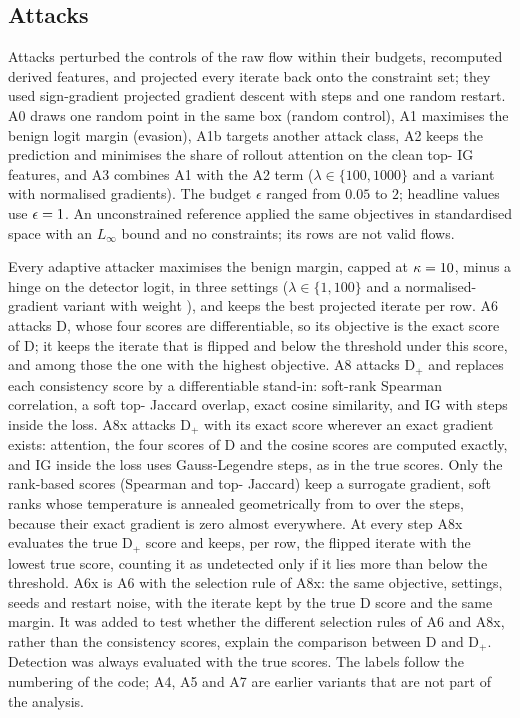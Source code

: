 \subsection*{Attacks}
\label{sec:attacks}
Attacks perturbed the controls of the raw flow within their budgets, recomputed derived features, and projected every
iterate back onto the constraint set; they used sign-gradient projected gradient descent with \paramSteps{} steps and
one random restart.
A0 draws one random point in the same box (random control), A1 maximises the benign logit margin (evasion), A1b targets
another attack class, A2 keeps the prediction and minimises the share of rollout attention on the clean
top-\paramTopK{} IG features, and A3 combines A1 with the A2 term ($\lambda \in \{100, 1000\}$ and a variant with
normalised gradients).
The budget $\epsilon$ ranged from $0.05$ to $2$; headline values use $\epsilon = 1$.
An unconstrained reference applied the same objectives in standardised space with an $L_\infty$ bound and no
constraints; its rows are not valid flows.

Every adaptive attacker maximises the benign margin, capped at $\kappa = 10$, minus a hinge on the detector
logit, in three settings ($\lambda \in \{1, 100\}$ and a normalised-gradient variant with weight \paramNormW), and
keeps the best projected iterate per row.
A6 attacks D, whose four scores are differentiable, so its objective is the exact score of D; it keeps the iterate
that is flipped and below the threshold under this score, and among those the one with the highest objective.
A8 attacks D$_+$ and replaces each consistency score by a differentiable stand-in: soft-rank Spearman correlation, a
soft top-\paramTopK{} Jaccard overlap, exact cosine similarity, and IG with \paramIGLoss{} steps inside the loss.
A8x attacks D$_+$ with its exact score wherever an exact gradient exists: attention, the four scores of D and the
cosine scores are computed exactly, and IG inside the loss uses \axIGSteps{} Gauss-Legendre steps, as in the true
scores.
Only the \nRankScores{} rank-based scores (Spearman and top-\paramTopK{} Jaccard) keep a surrogate gradient, soft ranks
whose temperature is annealed geometrically from \axTauStart{} to \axTauEnd{} over the steps, because their exact
gradient is zero almost everywhere.
At every step A8x evaluates the true D$_+$ score and keeps, per row, the flipped iterate with the lowest true score,
counting it as undetected only if it lies more than \axMargin{} below the threshold.
A6x is A6 with the selection rule of A8x: the same objective, settings, seeds and restart noise, with the iterate kept
by the true D score and the same margin.
It was added to test whether the different selection rules of A6 and A8x, rather than the consistency scores, explain
the comparison between D and D$_+$.
Detection was always evaluated with the true scores.
The labels follow the numbering of the code; A4, A5 and A7 are earlier variants that are not part of the analysis.

